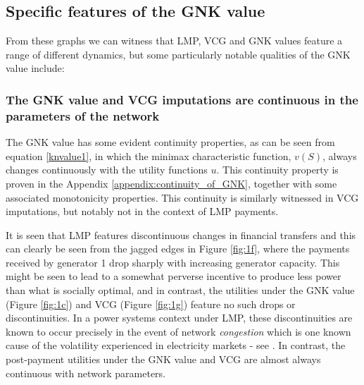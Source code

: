\subsection{Specific features of the GNK value}

From these graphs we can witness that LMP, VCG and GNK values feature a range of different dynamics,
but some particularly notable qualities of the GNK value include:


\subsubsection*{The GNK value and VCG imputations are continuous in the parameters of the network}
The GNK value has some evident continuity properties, as can be seen from equation \ref{knvalue1}, in which the minimax characteristic function, $v(S)$, always changes continuously with the utility functions $u$.
This continuity property is proven in the Appendix \ref{appendix:continuity_of_GNK}, together with some associated monotonicity properties.
This continuity is similarly witnessed in VCG imputations, but notably not in the context of LMP payments.

It is seen that LMP features discontinuous changes in financial transfers and this can clearly be seen from the jagged edges in Figure \ref{fig:1f}, where the payments received by generator 1 drop sharply with increasing generator capacity.
This might be seen to lead to a somewhat perverse incentive to produce less power than what is socially optimal, and in contrast, the utilities under the GNK value (Figure \ref{fig:1c}) and VCG  (Figure \ref{fig:1g}) feature no such drops or discontinuities.
In a power systems context under LMP, these discontinuities are known to occur precisely in the event of network \emph{congestion}
which is one known cause of the volatility experienced in electricity markets - see \cite{RePEc:aen:journl:2006v27-02-a09}. 
In contrast, the post-payment utilities under the GNK value and VCG are almost always continuous with network parameters.



